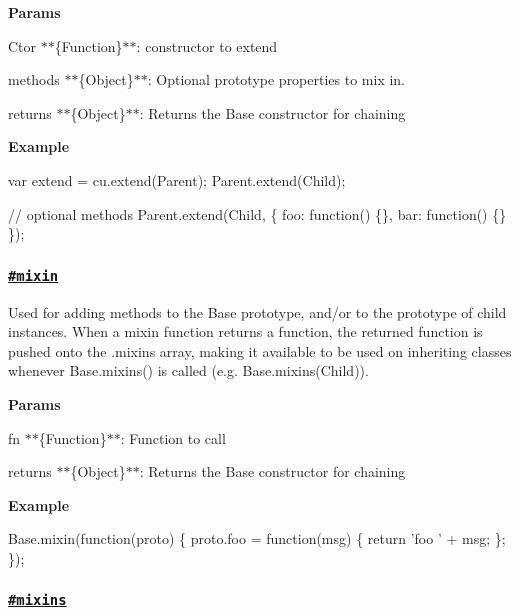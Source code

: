 {\bfseries Params}


\begin{DoxyItemize}
\item {\ttfamily Ctor} $\ast$$\ast$\{Function\}$\ast$$\ast$\+: constructor to extend
\item {\ttfamily methods} $\ast$$\ast$\{Object\}$\ast$$\ast$\+: Optional prototype properties to mix in.
\item {\ttfamily returns} $\ast$$\ast$\{Object\}$\ast$$\ast$\+: Returns the {\ttfamily Base} constructor for chaining
\end{DoxyItemize}

{\bfseries Example}


\begin{DoxyCode}
var extend = cu.extend(Parent);
Parent.extend(Child);

// optional methods
Parent.extend(Child, \{
  foo: function() \{\},
  bar: function() \{\}
\});
\end{DoxyCode}


\subsubsection*{\href{index.js#L379}{\tt \#mixin}}

Used for adding methods to the {\ttfamily Base} prototype, and/or to the prototype of child instances. When a mixin function returns a function, the returned function is pushed onto the {\ttfamily .mixins} array, making it available to be used on inheriting classes whenever {\ttfamily Base.\+mixins()} is called (e.\+g. {\ttfamily Base.\+mixins(\+Child)}).

{\bfseries Params}


\begin{DoxyItemize}
\item {\ttfamily fn} $\ast$$\ast$\{Function\}$\ast$$\ast$\+: Function to call
\item {\ttfamily returns} $\ast$$\ast$\{Object\}$\ast$$\ast$\+: Returns the {\ttfamily Base} constructor for chaining
\end{DoxyItemize}

{\bfseries Example}


\begin{DoxyCode}
Base.mixin(function(proto) \{
  proto.foo = function(msg) \{
    return 'foo ' + msg;
  \};
\});
\end{DoxyCode}


\subsubsection*{\href{index.js#L401}{\tt \#mixins}}

